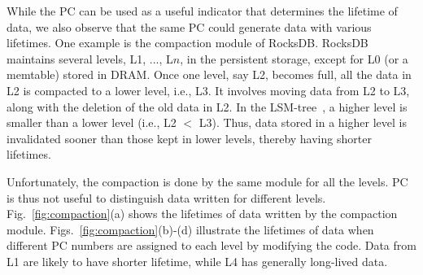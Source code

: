 While the PC can be used as a useful indicator that determines the lifetime of
data, we also observe that the same PC could generate data with various
lifetimes. One example is the compaction module of RocksDB. RocksDB maintains
several levels, L1, ..., L$n$, in the persistent storage, except for L0 (or a
memtable) stored in DRAM.  Once one level, say L2, becomes full, all the data
in L2 is compacted to a lower level, i.e., L3.  It involves moving data from L2
to L3, along with the deletion of the old data in L2.  In the
LSM-tree~\cite{LSM}, a higher level is smaller than a lower level (i.e., L2 $<$
L3). Thus, data stored in a higher level is invalidated sooner than those kept
in lower levels, thereby having shorter lifetimes.



Unfortunately, the compaction is done by the same module for all the levels.
PC is thus not useful to distinguish data written for different levels.
Fig.~\ref{fig:compaction}(a) shows the lifetimes of data written by the
compaction module.  Figs.~\ref{fig:compaction}(b)-(d) illustrate the lifetimes
of data when different PC numbers are assigned to each level by modifying the
code.  Data from L1 are likely to have shorter lifetime, while L4 has generally
long-lived data.

